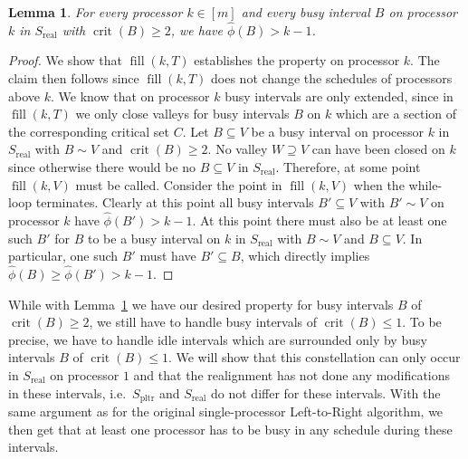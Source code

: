 \documentclass[a4paper]{article}
\DeclareMathOperator{\pltr}{pltr}
\DeclareMathOperator{\real}{real}
\DeclareMathOperator{\crit}{crit}
\DeclareMathOperator{\fillop}{fill}
\newtheorem{lemma}[theorem]{Lemma}
\begin{document}
\begin{lemma}\label{lemma:phi_prop}
  For every processor $k \in [m]$ and every busy interval $B$ on processor $k$ in $S_{\real}$ with $\crit(B) \geq 2$, we have $\hat \phi(B) > k - 1$.
\end{lemma}
\begin{proof}
  We show that $\fillop(k, T)$ establishes the property on processor $k$.
  The claim then follows since $\fillop(k, T)$ does not change the schedules of processors above $k$.
  We know that on processor $k$ busy intervals are only extended, since in $\fillop(k, T)$ we only close valleys for busy intervals $B$ on $k$ which are a section of the corresponding critical set $C$.
  Let $B \subseteq V$ be a busy interval on processor $k$ in $S_{\real}$ with $B \sim V$ and $\crit(B) \geq 2$.
  No valley $W \supseteq V$ can have been closed on $k$ since otherwise there would be no $B \subseteq V$ in $S_{\real}$.
  Therefore, at some point $\fillop(k, V)$ must be called.
  Consider the point in $\fillop(k, V)$ when the while-loop terminates.
  Clearly at this point all busy intervals $B' \subseteq V$ with $B' \sim V$ on processor $k$ have $\hat \phi(B') > k - 1$.
  At this point there must also be at least one such $B'$ for $B$ to be a busy interval on $k$ in $S_{\real}$ with $B \sim V$ and $B \subseteq V$.
  In particular, one such $B'$ must have $B' \subseteq B$, which directly implies $\hat \phi(B) \geq \hat \phi(B') > k - 1$.
\end{proof}
While with Lemma~\ref{lemma:phi_prop} we have our desired property for busy intervals $B$ of $\crit(B) \geq 2$, we still have to handle busy intervals of $\crit(B) \leq 1$.
To be precise, we have to handle idle intervals which are surrounded only by busy intervals $B$ of $\crit(B) \leq 1$.
We will show that this constellation can only occur in $S_{\real}$ on processor $1$ and that the realignment has not done any modifications in these intervals, i.e.\ $S_{\pltr}$ and $S_{\real}$ do not differ for these intervals.
With the same argument as for the original single-processor Left-to-Right algorithm, we then get that at least one processor has to be busy in any schedule during these intervals.
\end{document}
